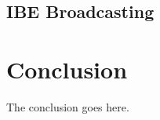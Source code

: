 \documentclass[journal]{IEEEtran}
\begin{document}
\subsection{IBE Broadcasting}

\subsection{}

\section{Conclusion}
The conclusion goes here.

%



\appendices


\ifCLASSOPTIONcaptionsoff
  \newpage
\fi


\end{document}

